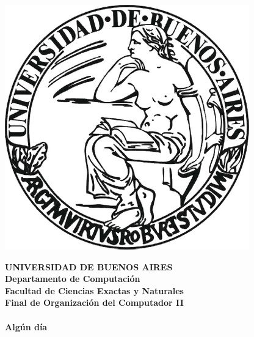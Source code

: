 \documentclass[a4paper]{article}
\begin{document}

\def\Materia{Final de Organizaci\'on del Computador II}
\def\Fecha{Alg\'un d\'ia}


\thispagestyle{empty}

\begin{center}
	\includegraphics[scale = 0.25]{logo_uba.jpg}
\end{center}

\vspace{5mm}

\begin{center}
	{\textbf{\large UNIVERSIDAD DE BUENOS AIRES}}\\[1.5em]
	{\textbf{\large Departamento de Computaci\'{o}n}}\\[1.5em]
    {\textbf{\large Facultad de Ciencias Exactas y Naturales}}\\
    \vspace{35mm}
    {\LARGE\textbf{\Materia}}\\[1em]    
    \vspace{15mm}
    {\Large \textbf{\Titulo}}\\[1em]
    \vspace{15mm}
    {\textbf{\Large \Fecha}}\\
    \vspace{15mm}
    \textbf{\tablaints}
\end{center}
\end{document}
